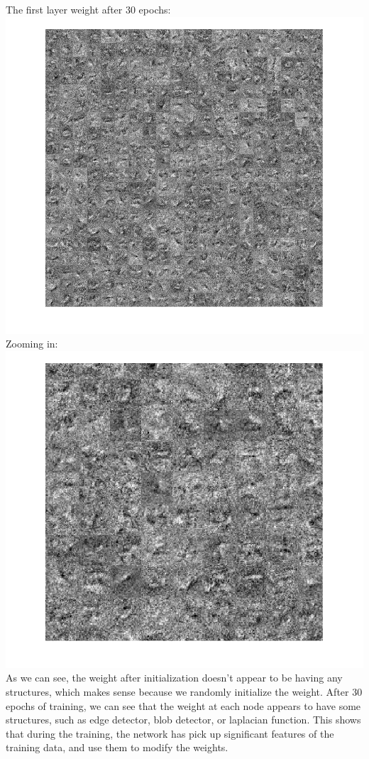 \documentclass[12pt,letterpaper,boxed]{hmcpset}
\begin{document}
\begin{solution}
\newpage
The first layer weight after 30 epochs:\\
\includegraphics[width=\textwidth]{3_1_3_21.png}\\
Zooming in:\\
\includegraphics[width=\textwidth]{3_1_3_111.png}\\
As we can see, the weight after initialization doesn't appear to be having any structures, which makes sense
because we randomly initialize the weight. After 30 epochs of training, we can see that the weight at each node
appears to have some structures, such as edge detector, blob detector, or laplacian function. This shows that
during the training, the network has pick up significant features of the training data, and use them to modify
the weights. 
\end{solution}
\newpage
\end{document}
